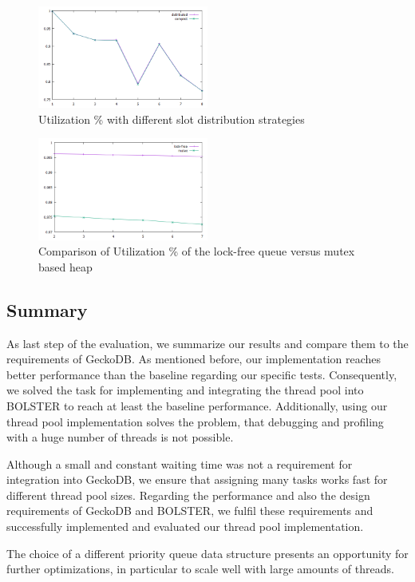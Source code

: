 \documentclass[conference]{IEEEtran}
\begin{document}
\begin{figure}
	\includegraphics[width=0.5\textwidth]{img/slot_distr.png}
	\caption{Utilization \% with different slot distribution strategies}
	\label{fig8}
\end{figure}

\begin{figure}
	\includegraphics[width=0.5\textwidth]{img/lock_free.png}
	\caption{Comparison of Utilization \% of the lock-free queue versus mutex based heap}
	\label{fig9}
\end{figure}

\subsection{Summary}
As last step of the evaluation, we summarize our results and compare them to the requirements of GeckoDB. As mentioned before, our implementation reaches better performance than the baseline regarding our specific tests. Consequently, we solved the task for implementing and integrating the thread pool into BOLSTER to reach at least the baseline performance. Additionally, using our thread pool implementation solves the problem, that debugging and profiling with a huge number of threads is not possible. 

Although a small and constant waiting time was not a requirement for integration into GeckoDB, we ensure that assigning many tasks works fast for different thread pool sizes. Regarding the performance and also the design requirements of GeckoDB and BOLSTER, we fulfil these requirements and successfully implemented and evaluated our thread pool implementation.

The choice of a different priority queue data structure presents an opportunity for further optimizations, in particular to scale well with large amounts of threads.
\end{document}
